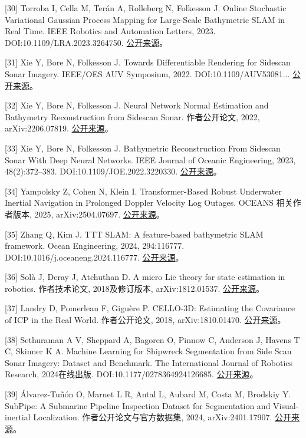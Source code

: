{[}30{]} Torroba I, Cella M, Terán A, Rolleberg N, Folkesson J. Online Stochastic Variational Gaussian Process Mapping for Large-Scale Bathymetric SLAM in Real Time. IEEE Robotics and Automation Letters, 2023. DOI:10.1109/LRA.2023.3264750. \href{https://arxiv.org/abs/2211.05601}{公开来源}。

{[}31{]} Xie Y, Bore N, Folkesson J. Towards Differentiable Rendering for Sidescan Sonar Imagery. IEEE/OES AUV Symposium, 2022. DOI:10.1109/\allowbreak AUV53081... \href{https://arxiv.org/abs/2206.07821}{公开来源}。

{[}32{]} Xie Y, Bore N, Folkesson J. Neural Network Normal Estimation and Bathymetry Reconstruction from Sidescan Sonar. 作者公开论文, 2022, arXiv:2206.07819. \href{https://arxiv.org/abs/2206.07819}{公开来源}。

{[}33{]} Xie Y, Bore N, Folkesson J. Bathymetric Reconstruction From Sidescan Sonar With Deep Neural Networks. IEEE Journal of Oceanic Engineering, 2023, 48(2):372--383. DOI:10.1109/JOE.2022.3220330. \href{https://arxiv.org/abs/2206.07810}{公开来源}。

{[}34{]} Yampolsky Z, Cohen N, Klein I. Transformer-Based Robust Underwater Inertial Navigation in Prolonged Doppler Velocity Log Outages. OCEANS 相关作者版本, 2025, arXiv:2504.07697. \href{https://arxiv.org/abs/2504.07697}{公开来源}。

{[}35{]} Zhang Q, Kim J. TTT SLAM: A feature-based bathymetric SLAM framework. Ocean Engineering, 2024, 294:116777. DOI:10.1016/j.oceaneng.2024.116777. \href{https://www.sciencedirect.com/science/article/pii/S0029801824001148}{公开来源}。

{[}36{]} Solà J, Deray J, Atchuthan D. A micro Lie theory for state estimation in robotics. 作者技术论文, 2018及修订版本, arXiv:1812.01537. \href{https://arxiv.org/abs/1812.01537}{公开来源}。

{[}37{]} Landry D, Pomerleau F, Giguère P. CELLO-3D: Estimating the Covariance of ICP in the Real World. 作者公开论文, 2018, arXiv:1810.01470. \href{https://arxiv.org/abs/1810.01470}{公开来源}。

{[}38{]} Sethuraman A V, Sheppard A, Bagoren O, Pinnow C, Anderson J, Havens T C, Skinner K A. Machine Learning for Shipwreck Segmentation from Side Scan Sonar Imagery: Dataset and Benchmark. The International Journal of Robotics Research, 2024在线出版. DOI:10.1177/0278364924126685. \href{https://arxiv.org/abs/2401.14546}{公开来源}。

{[}39{]} Álvarez-Tuñón O, Marnet L R, Antal L, Aubard M, Costa M, Brodskiy Y. SubPipe: A Submarine Pipeline Inspection Dataset for Segmentation and Visual-inertial Localization. 作者公开论文与官方数据集, 2024, arXiv:2401.17907. \href{https://github.com/remaro-network/SubPipe-dataset}{公开来源}。


